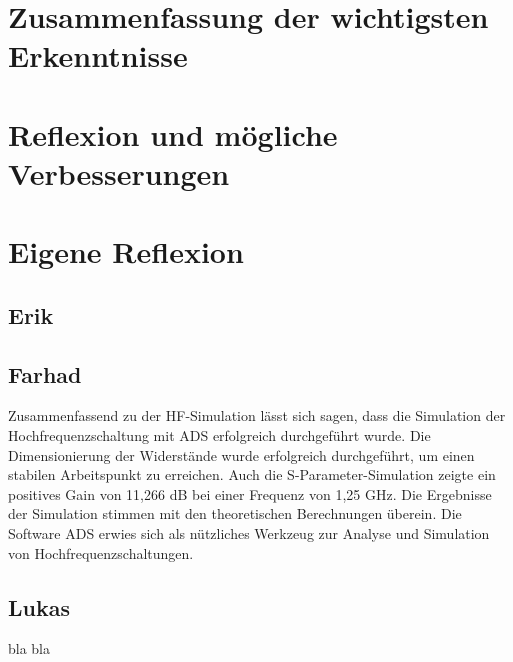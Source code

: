
\section{Zusammenfassung der wichtigsten Erkenntnisse}
\section{Reflexion und mögliche Verbesserungen}
\section{Eigene Reflexion}
\subsection{Erik}
\subsection{Farhad}
Zusammenfassend zu der HF-Simulation lässt sich sagen, dass die Simulation der Hochfrequenzschaltung mit \ac{ADS} erfolgreich durchgeführt wurde. Die Dimensionierung der Widerstände wurde erfolgreich durchgeführt, um einen stabilen Arbeitspunkt zu erreichen. Auch die S-Parameter-Simulation zeigte ein positives Gain von 11,266 dB bei einer Frequenz von 1{,}25 GHz.
Die Ergebnisse der Simulation stimmen mit den theoretischen Berechnungen überein.
Die Software \ac{ADS} erwies sich als nützliches Werkzeug zur Analyse und Simulation von Hochfrequenzschaltungen.
\subsection{Lukas}
bla bla
\clearpage